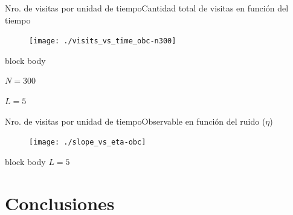 \documentclass{beamer}
\begin{document}
            \begin{frame}{Nro. de visitas por unidad de tiempo}{Cantidad total de visitas en función del tiempo}
                \begin{figure}[H!]
                    \texttt{[image: ./visits\_vs\_time\_obc-n300]}
                    \label{fig:obc_2}
                \end{figure}
                \begin{beamercolorbox}[sep=5pt,center]{block body}
                    \begin{minipage}[t]{0.45\textwidth}
                        \centering
                        \small{$N=300$}
                    \end{minipage}
                    \hfill
                    \begin{minipage}[t]{0.45\textwidth}
                        \centering
                        \small{$L=5$}
                    \end{minipage}
                \end{beamercolorbox}
            \end{frame}

            \begin{frame}{Nro. de visitas por unidad de tiempo}{Observable en función del ruido ($\eta$)}
                \begin{figure}[H!]
                    \texttt{[image: ./slope\_vs\_eta-obc]}
                    \label{fig:obc_3}
                \end{figure}
                \begin{beamercolorbox}[sep=5pt,center]{block body}
                    \small{$L=5$}
                \end{beamercolorbox}
            \end{frame}

    \section{Conclusiones}
\end{document}
